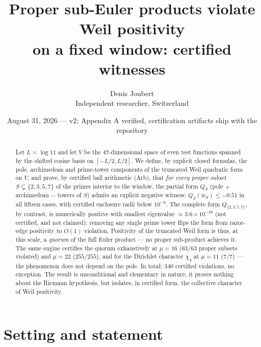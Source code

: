 \documentclass[10pt]{article}
\title{\bfseries Proper sub-Euler products violate Weil positivity\\ on a fixed window: certified witnesses}
\author{Denis Joubert\\ \small Independent researcher, Switzerland}
\date{August 31, 2026 --- v2; Appendix A verified, certification artifacts ship with the repository}
\begin{document}
\maketitle

\begin{abstract}
\noindent
Let $L=\log 11$ and let $V$ be the $47$-dimensional space of even test
functions spanned by the shifted cosine basis on $[-L/2,L/2]$. We define,
by explicit closed formulas, the pole, archimedean and prime-tower
components of the truncated Weil quadratic form on $V$, and prove, by
certified ball arithmetic (Arb), that \emph{for every proper subset}
$S\subsetneq\{2,3,5,7\}$ of the primes interior to the window, the partial
form $Q_S$ (pole $+$ archimedean $-$ towers of $S$) admits an explicit
negative witness: $Q_S(w_S)\le -0.51$ in all fifteen cases, with certified
enclosure radii below $10^{-8}$. The complete form $Q_{\{2,3,5,7\}}$, by
contrast, is numerically positive with smallest eigenvalue
$\approx 3.6\times10^{-48}$ (not certified, and not claimed): removing any
single prime tower flips the form from razor-edge positivity to $O(1)$
violation. Positivity of the truncated Weil form is thus, at this scale, a
\emph{quorum} of the full Euler product --- no proper sub-product achieves
it. The same engine certifies the quorum exhaustively at $\mu=16$
($63/63$ proper subsets violated) and $\mu=22$ ($255/255$), and for the
Dirichlet character $\chi_3$ at $\mu=11$ ($7/7$) --- the phenomenon does
not depend on the pole. In total: $340$ certified violations, no
exception. The result is unconditional and elementary in nature; it proves
nothing about the Riemann hypothesis, but isolates, in certified form, the
collective character of Weil positivity.
\end{abstract}

\section{Setting and statement}
\end{document}
